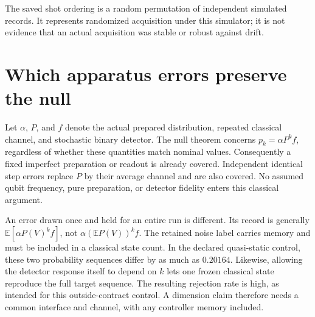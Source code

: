 The saved shot ordering is a random permutation of independent simulated
records. It represents randomized acquisition under this simulator; it is not
evidence that an actual acquisition was stable or robust against drift.

\section{Which apparatus errors preserve the null}
Let $\alpha$, $P$, and $f$ denote the actual prepared distribution, repeated
classical channel, and stochastic binary detector. The null theorem concerns
$p_k=\alpha P^k f$, regardless of whether these quantities match nominal values.
Consequently a fixed imperfect preparation or readout is already covered.
Independent identical step errors replace $P$ by their average channel and
are also covered. No assumed qubit frequency, pure preparation, or detector
fidelity enters this classical argument.

An error drawn once and held for an entire run is different. Its record is
generally $\mathbb E[\alpha P(V)^k f]$, not
$\alpha(\mathbb E P(V))^k f$. The retained noise label carries memory and must
be included in a classical state count. In the declared quasi-static control,
these two probability sequences differ by as much as $0.20164$. Likewise,
allowing the detector response itself to depend on $k$ lets one frozen
classical state reproduce the full target sequence. The resulting rejection
rate is high, as intended for this outside-contract control. A dimension
claim therefore needs a common interface and channel, with any controller
memory included.

